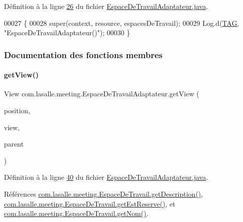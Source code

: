 Définition à la ligne \hyperlink{_espace_de_travail_adaptateur_8java_source_l00026}{26} du fichier \hyperlink{_espace_de_travail_adaptateur_8java_source}{Espace\+De\+Travail\+Adaptateur.\+java}.


\begin{DoxyCode}
00027     \{
00028         super(context, resource, espacesDeTravail);
00029         Log.d(\hyperlink{classcom_1_1lasalle_1_1meeting_1_1_espace_de_travail_adaptateur_a6d9fb5167546f9b1da395ca3ce3a577f}{TAG}, \textcolor{stringliteral}{"EspaceDeTravailAdaptateur()"});
00030     \}
\end{DoxyCode}


\subsubsection{Documentation des fonctions membres}
\mbox{\label{classcom_1_1lasalle_1_1meeting_1_1_espace_de_travail_adaptateur_a288239cdb1a4e23274361c4a5dc503ba}} 
\paragraph{\texorpdfstring{get\+View()}{getView()}}
{\footnotesize\ttfamily View com.\+lasalle.\+meeting.\+Espace\+De\+Travail\+Adaptateur.\+get\+View (\begin{DoxyParamCaption}\item[{int}]{position,  }\item[{View}]{view,  }\item[{View\+Group}]{parent }\end{DoxyParamCaption})}



Définition à la ligne \hyperlink{_espace_de_travail_adaptateur_8java_source_l00040}{40} du fichier \hyperlink{_espace_de_travail_adaptateur_8java_source}{Espace\+De\+Travail\+Adaptateur.\+java}.



Références \hyperlink{_espace_de_travail_8java_source_l00097}{com.\+lasalle.\+meeting.\+Espace\+De\+Travail.\+get\+Description()}, \hyperlink{_espace_de_travail_8java_source_l00117}{com.\+lasalle.\+meeting.\+Espace\+De\+Travail.\+get\+Est\+Reserve()}, et \hyperlink{_espace_de_travail_8java_source_l00087}{com.\+lasalle.\+meeting.\+Espace\+De\+Travail.\+get\+Nom()}.


